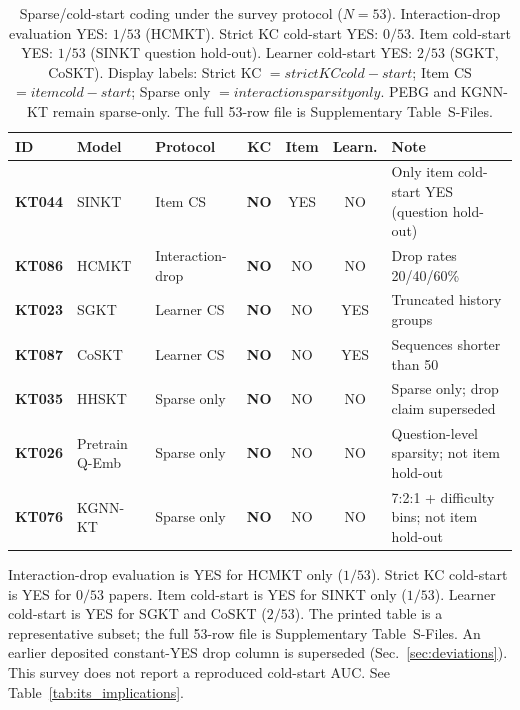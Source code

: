 \documentclass[lettersize,journal]{IEEEtran}
\begin{document}
\begin{table}[t]
\caption{Sparse/cold-start coding under the survey protocol ($N=53$). Interaction-drop evaluation YES: $1/53$ (HCMKT). Strict KC cold-start YES: $0/53$. Item cold-start YES: $1/53$ (SINKT question hold-out). Learner cold-start YES: $2/53$ (SGKT, CoSKT). Display labels: Strict KC $=strict KC cold-start$; Item CS $=item cold-start$; Sparse only $=interaction sparsity only$. PEBG and KGNN-KT remain sparse-only. The full 53-row file is Supplementary Table~S-Files.}
\label{tab:sparse_taxonomy}
\centering
\footnotesize
\setlength{\tabcolsep}{3.2pt}
\begin{tabular}{@{}ll l ccc p{3.55cm}@{}}
\toprule
\textbf{ID} & \textbf{Model} & \textbf{Protocol} & \textbf{KC} & \textbf{Item} & \textbf{Learn.} & \textbf{Note} \\
\midrule
\textbf{KT044} & SINKT \cite{KT044_SINKT_2024} & Item CS & \textbf{NO} & YES & NO & Only item cold-start YES (question hold-out) \\
\textbf{KT086} & HCMKT \cite{HCMKT_2026} & Interaction-drop & \textbf{NO} & NO & NO & Drop rates 20/40/60\% \\
\textbf{KT023} & SGKT \cite{KT023_SGKT_2022} & Learner CS & \textbf{NO} & NO & YES & Truncated history groups \\
\textbf{KT087} & CoSKT \cite{CoSKT_2024} & Learner CS & \textbf{NO} & NO & YES & Sequences shorter than 50 \\
\textbf{KT035} & HHSKT \cite{KT035_HHSKT_2023} & Sparse only & \textbf{NO} & NO & NO & Sparse only; drop claim superseded \\
\textbf{KT026} & Pretrain Q-Emb \cite{KT026_PretrainQ_2020} & Sparse only & \textbf{NO} & NO & NO & Question-level sparsity; not item hold-out \\
\textbf{KT076} & KGNN-KT \cite{KT076_KGNNKT_2025} & Sparse only & \textbf{NO} & NO & NO & 7:2:1 + difficulty bins; not item hold-out \\
\bottomrule
\end{tabular}
\end{table}
Interaction-drop evaluation is YES for HCMKT only ($1/53$). Strict KC cold-start is YES for $0/53$ papers. Item cold-start is YES for SINKT only ($1/53$). Learner cold-start is YES for SGKT and CoSKT ($2/53$). The printed table is a representative subset; the full 53-row file is Supplementary Table~S-Files. An earlier deposited constant-YES drop column is superseded (Sec.~\ref{sec:deviations}). This survey does not report a reproduced cold-start AUC. See Table~\ref{tab:its_implications}.
\end{document}
